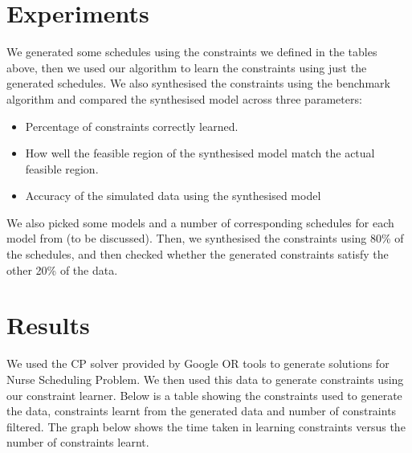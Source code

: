 \documentclass{article}
\begin{document}
\section{Experiments}
We generated some schedules using the constraints we defined in the tables above, then we used our algorithm to learn the constraints using just the generated schedules. We also synthesised the constraints using the benchmark algorithm and compared the synthesised model across three parameters:
\begin{itemize}
\item Percentage of constraints correctly learned.
\item How well the feasible region of the synthesised model match the actual feasible region.
\item Accuracy of the simulated data using the synthesised model
\end{itemize}
We also picked some models and a number of corresponding schedules for each model from (to be discussed). Then, we synthesised the constraints using 80\% of the schedules, and then checked whether the generated constraints satisfy the other 20\% of the data.

\section{Results}
We used the CP solver provided by Google OR tools to generate solutions for Nurse Scheduling Problem. We then used this data to generate constraints using our constraint learner. Below is a table showing the constraints used to generate the data, constraints learnt from the generated data and number of constraints filtered.
\newline
\newline
The graph below shows the time taken in learning constraints versus the number of constraints learnt.

\appendix



\end{document}
